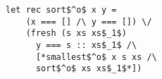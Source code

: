 \begin{figure}[h]
  \centering
  \begin{minipage}{0.65\columnwidth}
    \begin{lstlisting}[frame=tb]
 let rec sort$^o$ x y =
    (x === [] /\ y === []) \/ 
    (fresh (s xs xs$_1$)
      y === s :: xs$_1$ /\
      [*smallest$^o$ x s xs /\
      sort$^o$ xs xs$_1$*])
    \end{lstlisting}
  \end{minipage}
\end{figure}
